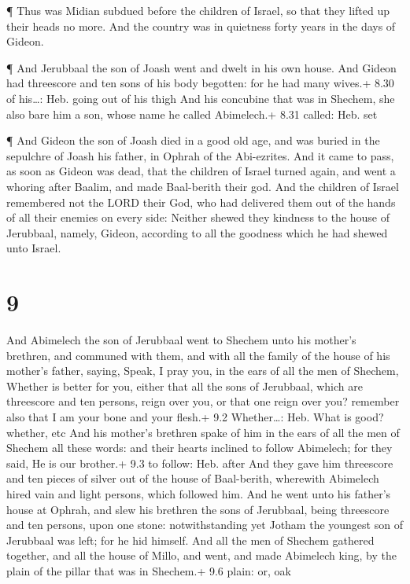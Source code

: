  ¶ Thus was Midian subdued before the children of Israel,
so that they lifted up their heads no more. And the country was in
quietness forty years in the days of Gideon.

 ¶ And Jerubbaal the son of Joash went and dwelt in his own
house.  And Gideon had threescore and ten sons of his body
begotten: for he had many wives.+ 8.30 of his\ldots: Heb. going out of
his thigh  And his concubine that was in Shechem, she also
bare him a son, whose name he called Abimelech.+ 8.31 called: Heb. set

 ¶ And Gideon the son of Joash died in a good old age, and
was buried in the sepulchre of Joash his father, in Ophrah of the
Abi-ezrites.  And it came to pass, as soon as Gideon was
dead, that the children of Israel turned again, and went a whoring after
Baalim, and made Baal-berith their god.  And the children
of Israel remembered not the LORD their God, who had delivered them out
of the hands of all their enemies on every side:  Neither
shewed they kindness to the house of Jerubbaal, namely, Gideon,
according to all the goodness which he had shewed unto Israel.

\hypertarget{section-8}{%
\section{9}\label{section-8}}

 And Abimelech the son of Jerubbaal went to Shechem unto his
mother's brethren, and communed with them, and with all the family of
the house of his mother's father, saying,  Speak, I pray
you, in the ears of all the men of Shechem, Whether is better for you,
either that all the sons of Jerubbaal, which are threescore and ten
persons, reign over you, or that one reign over you? remember also that
I am your bone and your flesh.+ 9.2 Whether\ldots: Heb. What is good?
whether, etc  And his mother's brethren spake of him in the
ears of all the men of Shechem all these words: and their hearts
inclined to follow Abimelech; for they said, He is our brother.+ 9.3 to
follow: Heb. after  And they gave him threescore and ten
pieces of silver out of the house of Baal-berith, wherewith Abimelech
hired vain and light persons, which followed him.  And he
went unto his father's house at Ophrah, and slew his brethren the sons
of Jerubbaal, being threescore and ten persons, upon one stone:
notwithstanding yet Jotham the youngest son of Jerubbaal was left; for
he hid himself.  And all the men of Shechem gathered
together, and all the house of Millo, and went, and made Abimelech king,
by the plain of the pillar that was in Shechem.+ 9.6 plain: or, oak

